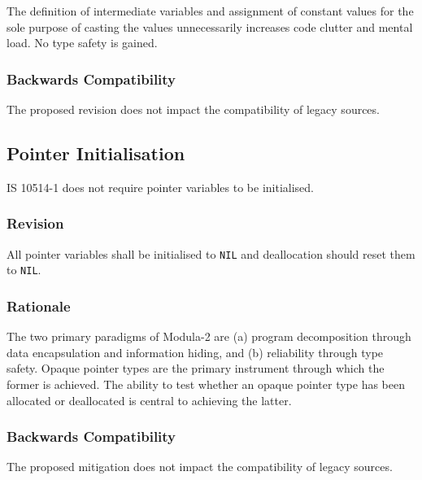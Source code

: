 \documentclass[10pt,a4paper,leqno,fleqn]{article}
\begin{document}
The definition of intermediate variables and assignment of constant values
for the sole purpose of casting the values unnecessarily increases code clutter
and mental load. No type safety is gained.

\subsubsection{Backwards Compatibility}

The proposed revision does not impact the compatibility of legacy sources.


\subsection{Pointer Initialisation}

IS 10514-1 does not require pointer variables to be initialised.

\subsubsection{Revision}

All pointer variables shall be initialised to \verb|NIL| and deallocation
should reset them to \verb|NIL|.

\subsubsection{Rationale}
The two primary paradigms of Modula-2 are (a) program decomposition through
data encapsulation and information hiding, and (b) reliability through type
safety. Opaque pointer types are the primary instrument through which the
former is achieved. The ability to test whether an opaque pointer type has
been allocated or deallocated is central to achieving the latter.

\subsubsection{Backwards Compatibility}

The proposed mitigation does not impact the compatibility of legacy sources.


\end{document}
